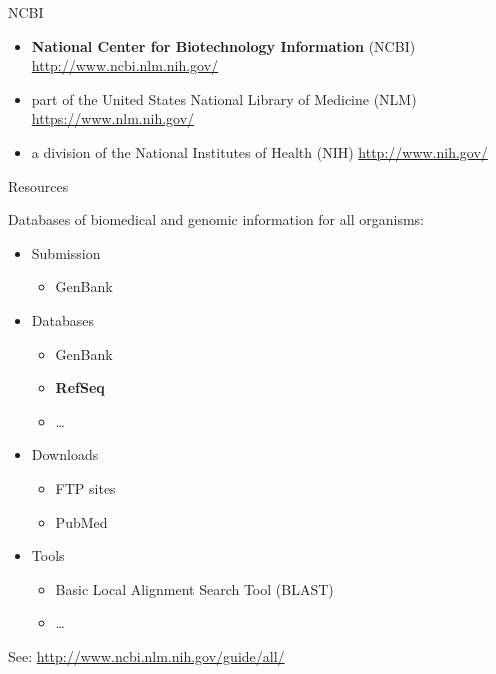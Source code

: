 \begin{frame}{NCBI}

\begin{itemize}
\item
  \textbf{National Center for Biotechnology Information} (NCBI)
  \url{http://www.ncbi.nlm.nih.gov/}
\item
  part of the United States National Library of Medicine (NLM)
  \url{https://www.nlm.nih.gov/}
\item
  a division of the National Institutes of Health (NIH)
  \url{http://www.nih.gov/}
\end{itemize}

\end{frame}

\begin{frame}{Resources}

Databases of biomedical and genomic information for all organisms:

\begin{itemize}
\itemsep1pt\parskip0pt
\item
  Submission

  \begin{itemize}
  \itemsep1pt\parskip0pt
  \item
    GenBank
  \end{itemize}
\item
  Databases

  \begin{itemize}
  \itemsep1pt\parskip0pt
  \item
    GenBank
  \item
    \textbf{RefSeq}
  \item
    \ldots{}
  \end{itemize}
\item
  Downloads

  \begin{itemize}
  \itemsep1pt\parskip0pt
  \item
    FTP sites
  \item
    PubMed
  \end{itemize}
\item
  Tools

  \begin{itemize}
  \itemsep1pt\parskip0pt
  \item
    Basic Local Alignment Search Tool (BLAST)
  \item
    \ldots{}
  \end{itemize}
\end{itemize}

See: \url{http://www.ncbi.nlm.nih.gov/guide/all/}

\end{frame}


